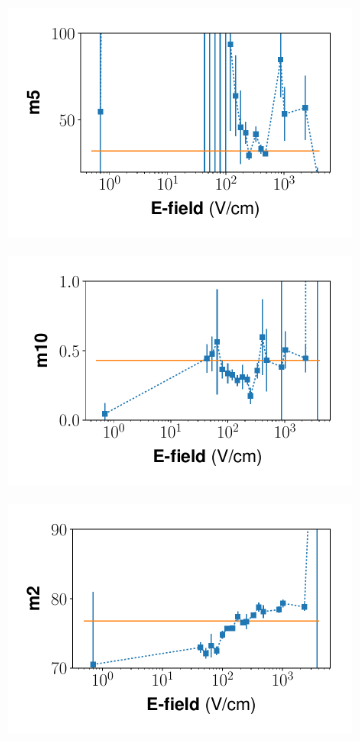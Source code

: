 \begin{figure}[!h]
\begin{subfigure}{0.33\linewidth}
  \includegraphics[width=\textwidth]{Figures/Yields_fit_new/NEST_m5_fit_new.pdf}
  \caption{}
\end{subfigure}
\begin{subfigure}{0.33\linewidth}
  \includegraphics[width=\textwidth]{Figures/Yields_fit_new/NEST_m10_fit_new.pdf}
  \caption{}
\end{subfigure}%
\begin{subfigure}{0.33\linewidth}
  \includegraphics[width=\textwidth]{Figures/Yields_fit_new/NEST_m2_fit_new.pdf}

\end{subfigure}
\end{figure}
